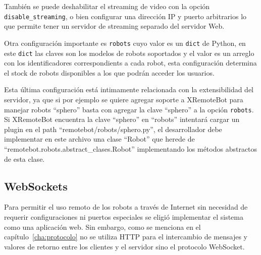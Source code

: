 También se puede deshabilitar el streaming de video con la opción
\texttt{disable\_streaming}, o bien configurar una dirección IP y
puerto arbitrarios lo que permite tener un servidor de streaming
separado del servidor Web.

Otra configuración importante es \texttt{robots} cuyo valor
es un \texttt{dict} de Python, en este \texttt{dict} las
claves son los modelos de robots soportados y el valor
es un arreglo con los identificadores correspondients a cada robot,
esta configuración determina el stock de robots disponibles a los
que podrán acceder los usuarios.

Esta última configuración está intimamente
relacionada con la extensibilidad del servidor, ya que si por ejemplo
se quiere agregar soporte a XRemoteBot para manejar robots ``sphero''
basta con agregar la clave ``sphero'' a la opción
\texttt{robots}. Si XRemoteBot encuentra la clave ``sphero'' en ``robots''
intentará cargar un plugin en el path
``remotebot/robots/sphero.py'',
el desarrollador debe implementar en este archivo una clase ``Robot''
que herede de ``remotebot.robots.abstract\_clases.Robot'' implementando
los métodos abstractos de esta clase.



% 
% 

\subsection{WebSockets}\label{sec:websockets}

Para permitir el uso remoto de los robots a través de Internet sin necesidad
de requerir configuraciones ni puertos especiales se eligió implementar el
sistema como una
aplicación web. Sin embargo, como se menciona en el
capítulo~\ref{cha:protocolo} no se utiliza HTTP para el intercambio de
mensajes y valores de retorno entre los clientes y el servidor sino el
protocolo WebSocket.

